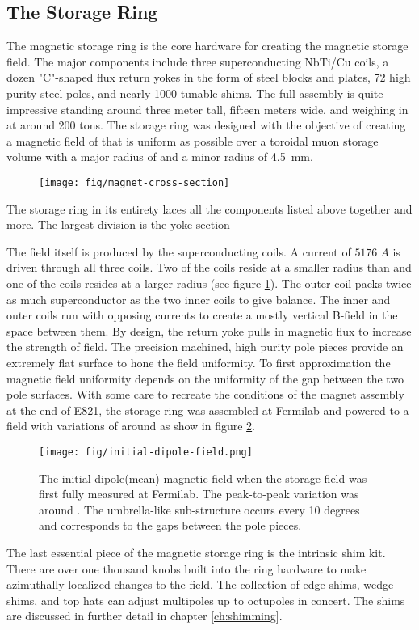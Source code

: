 \subsection{The Storage Ring}

The magnetic storage ring is the core hardware for creating the magnetic storage field.  The major components include three superconducting NbTi/Cu coils, a dozen "C"-shaped flux return yokes in the form of steel blocks and plates, 72 high purity steel poles, and nearly 1000 tunable shims.  The full assembly is quite impressive standing around three meter tall, fifteen meters wide, and weighing in at around 200 tons.  The storage ring was designed with the objective of creating a magnetic field of \bmagic that is uniform as possible over a toroidal muon storage volume with a major radius of \rmagic and a minor radius of \SI{4.5}{\mm}.

\begin{figure}
\texttt{[image: fig/magnet-cross-section]}
\caption{}
\label{fig:magnet-cross-section}
\end{figure}

The storage ring in its entirety laces all the components listed above together and more.  The largest division is the yoke section

The field itself is produced by the superconducting coils.  A current of $5176\;A$ is driven through all three coils.  Two of the coils reside at a smaller radius than \rmagic and one of the coils resides at a larger radius (see figure \ref{fig:magnet-cross-section}).  The outer coil packs twice as much superconductor as the two inner coils to give balance.  The inner and outer coils run with opposing currents to create a mostly vertical B-field in the space between them.  By design, the return yoke pulls in magnetic flux to increase the strength of field.  The precision machined, high purity pole pieces provide an extremely flat surface to hone the field uniformity.  To first approximation the magnetic field uniformity depends on the uniformity of the gap between the two pole surfaces.  With some care to recreate the  conditions of the magnet assembly at the end of E821, the storage ring was assembled at Fermilab and powered to a field with variations of around  as show in figure \ref{fig:initial-field}.

\begin{figure}
\texttt{[image: fig/initial-dipole-field.png]}
\caption{The initial dipole(mean) magnetic field when the storage field was first fully measured at Fermilab.  The peak-to-peak variation was around .  The umbrella-like sub-structure occurs every 10 degrees and corresponds to the gaps between the pole pieces.}
\label{fig:initial-field}
\end{figure}

The last essential piece of the magnetic storage ring is the intrinsic shim kit.  There are over one thousand knobs built into the ring hardware to make azimuthally localized changes to the field.  The collection of edge shims, wedge shims, and top hats can adjust multipoles up to octupoles in concert.  The shims are discussed in further detail in chapter \ref{ch:shimming}.
